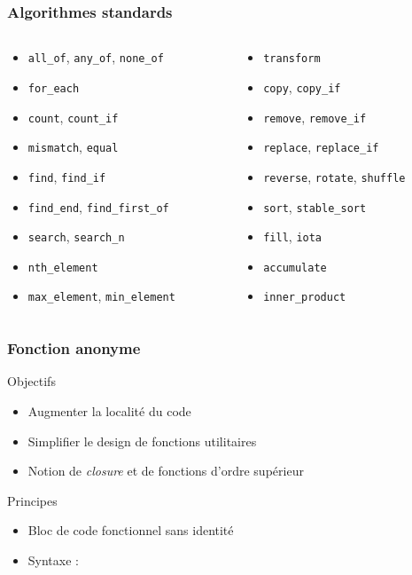 \documentclass[svgnames]{beamer}
\begin{document}
\frame
{
  \frametitle{Algorithmes standards}
  \begin{columns}[t]
    \begin{column}{5cm}
    \begin{itemize}
    \item \texttt{all\_of}, \texttt{any\_of}, \texttt{none\_of}
    \item \texttt{for\_each}
    \item \texttt{count}, \texttt{count\_if}
    \item \texttt{mismatch}, \texttt{equal}
    \item \texttt{find}, \texttt{find\_if}
    \item \texttt{find\_end}, \texttt{find\_first\_of}
    \item \texttt{search}, \texttt{search\_n}
    \item \texttt{nth\_element}
    \item \texttt{max\_element}, \texttt{min\_element}
    \end{itemize}
    \end{column}
    \begin{column}{5cm}
    \begin{itemize}
    \item \texttt{transform}
    \item \texttt{copy}, \texttt{copy\_if}
    \item \texttt{remove}, \texttt{remove\_if}
    \item \texttt{replace}, \texttt{replace\_if}
    \item \texttt{reverse}, \texttt{rotate}, \texttt{shuffle}
    \item \texttt{sort}, \texttt{stable\_sort}
    \item \texttt{fill}, \texttt{iota}
    \item \texttt{accumulate}
    \item \texttt{inner\_product}
    \end{itemize}
    \end{column}
  \end{columns}
}

\frame
{
  \frametitle{Fonction anonyme}
  \begin{block}{Objectifs}
  \begin{itemize}
  \item Augmenter la localité du code
  \item Simplifier le design de fonctions utilitaires
  \item Notion de \textit{closure} et de fonctions d'ordre sup\'erieur
  \end{itemize}
  \end{block}

  \begin{block}{Principes}
  \begin{itemize}
  \item Bloc de code fonctionnel sans identité
  \item Syntaxe :
  \end{itemize}
  \end{block}
}
\end{document}
